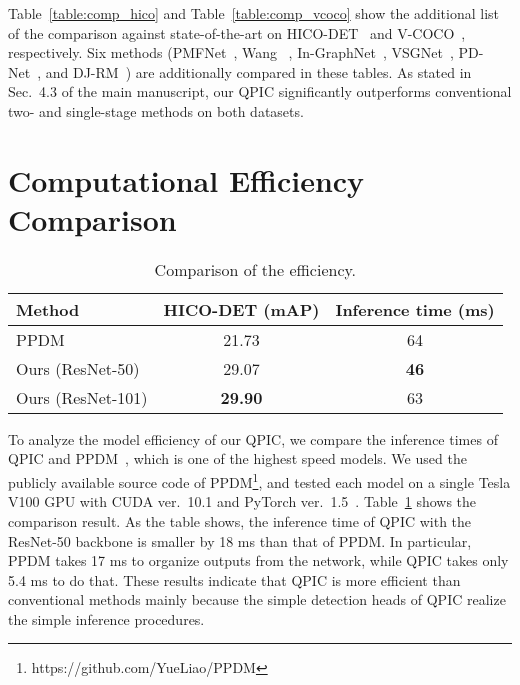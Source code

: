 \documentclass[final]{cvpr}
\begin{document}
Table~\ref{table:comp_hico} and Table~\ref{table:comp_vcoco} show the additional list of the comparison against state-of-the-art on HICO-DET~\cite{chao_wacv2018} and V-COCO~\cite{gupta_arxiv2015}, respectively. Six methods (PMFNet~\cite{wan_iccv2019}, Wang \etal~\cite{hai_eccv2020}, In-GraphNet~\cite{yang_ijcai2020}, VSGNet~\cite{ulutan_cvpr2020}, PD-Net~\cite{zhong_eccv2020}, and DJ-RM~\cite{li_cvpr2020}) are additionally compared in these tables. As stated in Sec.~{4.3} of the main manuscript, our QPIC significantly outperforms conventional two- and single-stage methods on both datasets.

\section{Computational Efficiency Comparison}
\begin{table}[t]
    \caption{Comparison of the efficiency.}
    \label{table:speed}
    \centering
    \small
    \setlength{\tabcolsep}{2pt}
    \begin{tabular}{@{}lcc@{}}
        \toprule
        Method & HICO-DET (mAP) & Inference time (ms) \\
        \midrule
        PPDM~\cite{liao_cvpr2020} & 21.73 & 64 \\
        Ours (ResNet-50) & 29.07 & \textbf{46} \\
        Ours (ResNet-101) & \textbf{29.90} & 63 \\
        \bottomrule
    \end{tabular}
\end{table}

To analyze the model efficiency of our QPIC, we compare the inference times of QPIC and PPDM~\cite{liao_cvpr2020}, which is one of the highest speed models. We used the publicly available source code of PPDM\footnote{https://github.com/YueLiao/PPDM}, and tested each model on a single Tesla V100 GPU with CUDA ver.~{10.1} and PyTorch ver.~{1.5}~\cite{peszke_nips2019}. Table~\ref{table:speed} shows the comparison result. As the table shows, the inference time of QPIC with the ResNet-50 backbone is smaller by 18 ms than that of PPDM. In particular, PPDM takes 17 ms to organize outputs from the network, while QPIC takes only 5.4 ms to do that. These results indicate that QPIC is more efficient than conventional methods mainly because the simple detection heads of QPIC realize the simple inference procedures.
\end{document}
